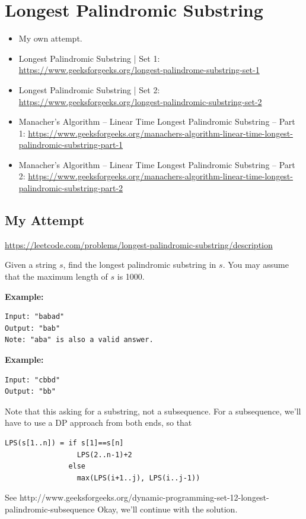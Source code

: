 \chapter[Longest Palindromic Substring]
{Longest Palindromic Substring
  \label{chLngstPlndrmcSbstrng}}


\begin{itemize}%
\item My own attempt.
\item Longest Palindromic Substring | Set 1:
  \url{https://www.geeksforgeeks.org/longest-palindrome-substring-set-1}
\item Longest Palindromic Substring | Set 2:
  \url{https://www.geeksforgeeks.org/longest-palindromic-substring-set-2}
\item Manacher's Algorithm -- Linear Time Longest Palindromic Substring --
  Part 1:
  \url{https://www.geeksforgeeks.org/manachers-algorithm-linear-time-longest-palindromic-substring-part-1}
\item Manacher's Algorithm -- Linear Time Longest Palindromic Substring --
  Part 2:
  \url{https://www.geeksforgeeks.org/manachers-algorithm-linear-time-longest-palindromic-substring-part-2}
\end{itemize}


\section{My Attempt\label{secLPSStrMyAttempt}}

\url{https://leetcode.com/problems/longest-palindromic-substring/description}

Given a string $s$, find the longest palindromic substring in $s$. You may
assume that the maximum length of $s$ is 1000.

\noindent{}\textbf{Example:}
\begin{lstlisting}[style=raygeneric]
Input: "babad"
Output: "bab"
Note: "aba" is also a valid answer.
\end{lstlisting}
\noindent{}\textbf{Example:}
\begin{lstlisting}[style=raygeneric]
Input: "cbbd"
Output: "bb"
\end{lstlisting}

\qasepline{}

Note that this asking for a substring, not a subsequence.
For a subsequence, we'll have to use a DP approach from both ends, so that
\begin{lstlisting}[style=raygeneric]
LPS(s[1..n]) = if s[1]==s[n]
                 LPS(2..n-1)+2
               else
                 max(LPS(i+1..j), LPS(i..j-1))
\end{lstlisting}
See http://www.geeksforgeeks.org/dynamic-programming-set-12-longest-palindromic-subsequence
Okay, we'll continue with the solution.

